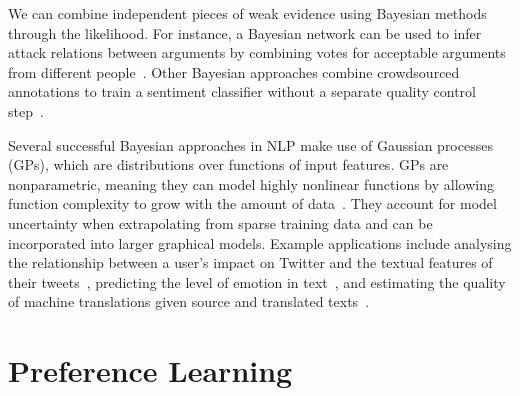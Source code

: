 We can combine independent pieces of weak evidence using Bayesian methods through the likelihood.
For instance, a Bayesian network can be used to infer attack relations between arguments by combining votes for acceptable arguments from different people~\cite{kido2017}.
Other Bayesian approaches combine crowdsourced annotations to train a sentiment classifier
without a separate quality control step~\cite{simpson2015language,felt2016semantic}.

Several successful Bayesian approaches in NLP make use of Gaussian processes (GPs), which are 
distributions over functions of input features. 
GPs are nonparametric, meaning they can model highly nonlinear functions by
allowing function complexity to grow with the amount of data~\cite{rasmussen_gaussian_2006}.
They account for model uncertainty when extrapolating from sparse training data
and can be incorporated into larger graphical models.
Example applications include analysing the relationship between a user's impact on Twitter 
and the textual features of their tweets~\cite{lampos2014predicting}, 
predicting the level of emotion in text~\cite{beck2014joint},
and estimating the quality of machine translations given source and translated texts~\cite{cohn2013modelling}.

\section{Preference Learning}\label{sec:pref_learning}

